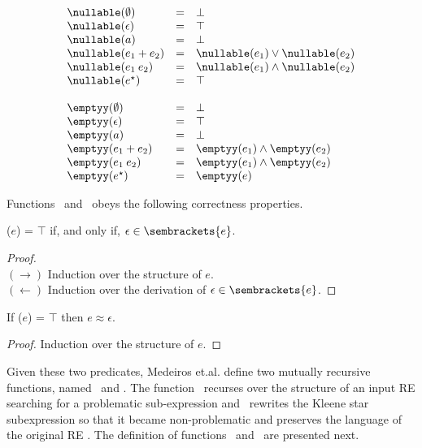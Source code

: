 \[
\begin{array}{lcl}
   \nullable(\emptyset) & = & \bot \\ 
   \nullable(\epsilon)  & = & \top \\
   \nullable(a)         & = & \bot \\ 
   \nullable(e_1 + e_2) & = & \nullable(e_1)\lor\nullable(e_2)\\
   \nullable(e_1\:e_2)  & = & \nullable(e_1)\land\nullable(e_2)\\
   \nullable(e ^\star)  & = & \top \\
   \\
   \emptyy(\emptyset)    & = & \bot \\ 
   \emptyy(\epsilon)     & = & \top \\
   \emptyy(a)            & = & \bot \\
   \emptyy(e_1 + e_2)    & = & \emptyy(e_1) \land \emptyy(e_2)\\
   \emptyy(e_1\:e_2)     & = & \emptyy(e_1) \land \emptyy(e_2)\\
   \emptyy(e ^\star)     & = & \emptyy(e)\\        
\end{array}
\]



Functions \nullable$\,$ and \emptyy$\,$ obeys the following correctness properties.



\begin{Lemma}
   \nullable($e$) = $\top$ if, and only if, $\epsilon\in\sembrackets{e}$.
\end{Lemma}
\begin{proof}$\,$\\
  $(\to)$ Induction over the structure of $e$. \\$(\leftarrow)$ Induction over the derivation of $\epsilon \in\sembrackets{e}$.
\end{proof}

\begin{Lemma}
   If \emptyy($e$) = $\top$ then $e \approx \epsilon$.
\end{Lemma}
\begin{proof}
   Induction over the structure of $e$.
\end{proof}
  


Given these two predicates, Medeiros et.al. define two mutually recursive functions,
named \fin$\,$ and \fout. The function \fout$\,$ recurses over the structure of an input RE
searching for a problematic sub-expression and \fin$\,$ rewrites the Kleene star subexpression
so that it became non-problematic and preserves the language of the original 
RE \cite{Medeiros14}. The definition of functions \fin$\,$ and \fout$\,$ are presented next.



